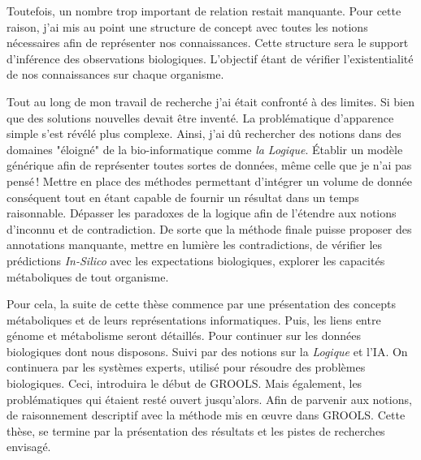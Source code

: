 \begin{refsection}
Toutefois, un nombre trop important de relation restait manquante. Pour cette raison, j'ai mis au point une structure de concept avec toutes les notions nécessaires afin de représenter nos connaissances. Cette structure sera le support d'inférence des observations biologiques. L'objectif étant de vérifier l'existentialité de nos connaissances sur chaque organisme.

Tout au long de mon travail de recherche j'ai était confronté à des limites. Si bien que des solutions nouvelles devait être inventé. La problématique d'apparence simple s'est révélé plus complexe. Ainsi, j'ai dû rechercher des notions dans des domaines "éloigné" de la bio-informatique comme \textit{la Logique}. Établir un modèle générique afin de représenter toutes sortes de données, même celle que je n'ai pas pensé ! Mettre en place des méthodes permettant d'intégrer un volume de donnée conséquent tout en étant capable de fournir un résultat dans un temps raisonnable. Dépasser les paradoxes de la logique afin de l'étendre aux notions d'inconnu et de contradiction. De sorte que la méthode finale puisse proposer des annotations manquante, mettre en lumière les contradictions, de vérifier les prédictions \textit{In-Silico} avec les expectations biologiques, explorer les capacités métaboliques de tout organisme.

Pour cela, la suite de cette thèse commence par une présentation des concepts métaboliques et de leurs représentations informatiques. Puis, les liens entre génome et métabolisme seront détaillés. Pour continuer sur les données biologiques dont nous disposons. Suivi par des notions sur la \textit{Logique} et l'\gls{IA}. On continuera par les systèmes experts, utilisé pour résoudre des problèmes biologiques. Ceci, introduira le début de GROOLS. Mais également, les problématiques qui étaient resté ouvert jusqu'alors. Afin de parvenir aux notions, de raisonnement descriptif avec la méthode mis en œuvre dans GROOLS. Cette thèse, se termine par la présentation des résultats et les pistes de recherches envisagé.

\subbibliography
\end{refsection}
